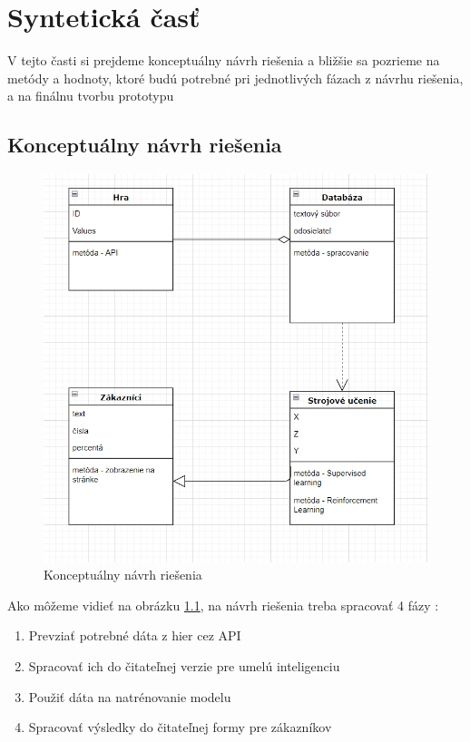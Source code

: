 
\chapter{Syntetická časť}
\label{methodology}
V tejto časti si prejdeme konceptuálny návrh riešenia a bližšie sa pozrieme na metódy a hodnoty, ktoré budú potrebné pri jednotlivých fázach z návrhu riešenia, a na finálnu tvorbu prototypu 
\section{Konceptuálny návrh riešenia}

 \begin{figure}[h!]
	
	\includegraphics[width=.9\textwidth]{figures/navrhriesenia}
	\centering
	\caption{ Konceptuálny návrh riešenia \label{koncept}}
	
\end{figure}

Ako môžeme vidieť na obrázku \ref{koncept}, na návrh riešenia treba spracovať 4 fázy : 

\begin{enumerate}
	\item Prevziať potrebné dáta z hier cez API
	\item Spracovať ich do čitateľnej verzie pre umelú inteligenciu
	\item Použiť dáta na natrénovanie modelu
	\item Spracovať výsledky do čitateľnej formy pre zákazníkov
\end{enumerate}


